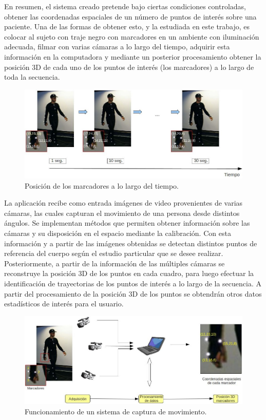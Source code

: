 En resumen, el sistema creado pretende bajo ciertas condiciones controladas, obtener las coordenadas espaciales de un número de puntos de interés sobre una paciente. Una de las formas de obtener esto, y la estudiada en este trabajo, es colocar al sujeto con traje negro con marcadores en un ambiente con iluminación adecuada, filmar con varias cámaras a lo largo del tiempo, adquirir esta información en la computadora y mediante un posterior procesamiento obtener la posición 3D de cada uno de los puntos de interés (los marcadores) a lo largo de toda la secuencia.

\begin{figure}[H]
\begin{center}
\includegraphics[scale=0.4]{img/Sistema_completo/diagrama_abuelas_2.jpg}
\end{center}
\caption{Posición de los marcadores a lo largo del tiempo.}
\label{abuela2}
\end{figure}

La aplicación recibe como entrada imágenes de video provenientes de varias cámaras, las cuales capturan el movimiento de una persona desde distintos ángulos. Se implementan métodos que permiten obtener información sobre las cámaras y su disposición en el espacio mediante la calibración. Con esta información y a partir de las imágenes obtenidas se detectan distintos puntos de referencia del cuerpo según el estudio particular que se desee realizar. Posteriormente, a partir de la información de las múltiples cámaras se reconstruye la posición 3D de los puntos en cada cuadro, para luego efectuar la identificación de trayectorias de los puntos de interés a lo largo de la secuencia. A partir del procesamiento de la posición 3D de los puntos se obtendrán otros datos estadísticos de interés para el usuario.

\begin{figure}[H]
\begin{center}
\includegraphics[scale=0.4]{img/Sistema_completo/diagrama_abuelas_1.jpg}
\end{center}
\caption{Funcionamiento de un sistema de captura de movimiento.}
\label{abuela1}
\end{figure}


